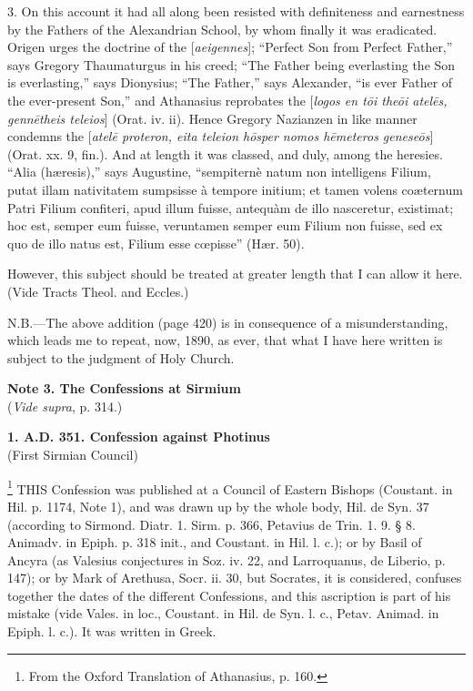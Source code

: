 3. On this account it had all along been resisted with definiteness
and earnestness by the Fathers of the Alexandrian School, by whom
finally it was eradicated. Origen urges the doctrine of the [\emph{aeigennes}];
``Perfect Son from Perfect Father,'' says Gregory Thaumaturgus
in his creed; ``The Father being everlasting the Son is
everlasting,'' says Dionysius; ``The Father,'' says
Alexander, ``is ever Father of the ever-present Son,'' and
Athanasius reprobates the [\emph{logos en t\={o}i the\={o}i atel\={e}s,
genn\={e}theis teleios}] (Orat. iv. ii). Hence Gregory Nazianzen
in like manner condemns the [\emph{atel\={e} proteron, eita teleion h\={o}sper
nomos h\={e}meteros genese\={o}s}] (Orat. xx. 9, fin.). And
at length it was classed, and duly, among the heresies. ``Alia (hæresis),''
says Augustine, ``sempiternè natum non intelligens Filium, putat
illam nativitatem sumpsisse à tempore initium; et tamen volens
coæternum Patri Filium confiteri, apud illum fuisse, antequàm de
illo nasceretur, existimat; hoc est, semper eum fuisse, veruntamen
semper eum Filium non fuisse, sed ex quo de illo natus est, Filium
esse cœpisse'' (Hær. 50).

However, this subject should be treated at greater length that I
can allow it here. (Vide Tracts Theol. and
Eccles.)

N.B.—The above addition (page 420) is in consequence of a
misunderstanding, which leads me to repeat, now, 1890, as ever, that
what I have here written is subject to the judgment of Holy Church.

\textbf{Note 3. The Confessions at Sirmium}\\
(\emph{Vide supra}, p. 314.)

\textbf{1. A.D. 351.
Confession against Photinus}\\
(First Sirmian Council)

\footnote{From the Oxford Translation of Athanasius, p. 160.} THIS
Confession was published at a Council of Eastern Bishops (Coustant. in
Hil. p. 1174, Note 1), and was drawn up by the whole body, Hil. de Syn.
37 (according to Sirmond. Diatr. 1. Sirm. p. 366, Petavius de Trin. 1.
9. § 8. Animadv. in Epiph. p. 318 init., and Coustant. in Hil. l.
c.); or by Basil of Ancyra (as Valesius conjectures in Soz. iv. 22,
and Larroquanus, de Liberio, p. 147); or by Mark of Arethusa, Socr.
ii. 30, but Socrates, it is considered, confuses together the dates of
the different Confessions, and this ascription is part of his mistake
(vide Vales. in loc., Coustant. in Hil. de Syn. l. c., Petav. Animad.
in Epiph. l. c.). It was written in Greek.

